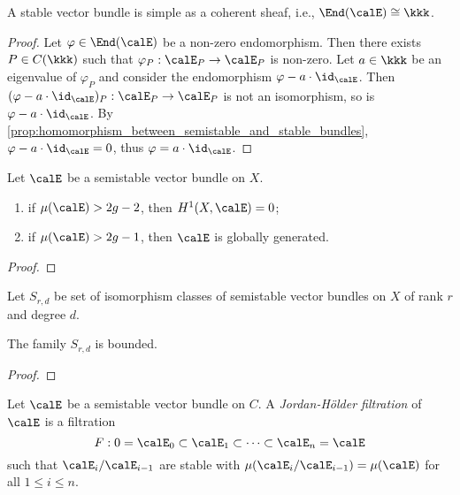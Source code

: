     \begin{corollary}\label{cor:stable_vector_bundles_are_simple}
        A stable vector bundle is simple as a coherent sheaf, i.e., \(\End(\calE) \cong \kkk\).
    \end{corollary}
    \begin{proof}
        Let \(\varphi \in \End(\calE)\) be a non-zero endomorphism.
        Then there exists \(P \in C(\kkk)\) such that \(\varphi_P : \calE_P \to \calE_P\) is non-zero.
        Let \(a \in \kkk\) be an eigenvalue of \(\varphi_P\) and consider the endomorphism \(\varphi - a \cdot \id_\calE\).
        Then \((\varphi - a \cdot \id_\calE)_P : \calE_P \to \calE_P\) is not an isomorphism, so is \(\varphi - a \cdot \id_\calE\).
        By \cref{prop:homomorphism_between_semistable_and_stable_bundles}, \(\varphi - a \cdot \id_\calE = 0\), thus \(\varphi = a \cdot \id_\calE\).
    \end{proof}

    \begin{lemma}\label{lem:vanishing_and_global_generation_of_semistable_vector_bundles}
        Let \(\calE\) be a semistable vector bundle on \(X\).
        \begin{enumerate}
            \item if \(\mu(\calE) > 2g-2\), then \(H^1(X,\calE) = 0\);
            \item if \(\mu(\calE) > 2g-1\), then \(\calE\) is globally generated.
        \end{enumerate}
    \end{lemma}
    \begin{proof}
    \end{proof}

    Let \(S_{r,d}\) be set of isomorphism classes of semistable vector bundles on \(X\) of rank \(r\) and degree \(d\).

    \begin{proposition}\label{prop:semistable_vector_bundles_are_bounded}
        The family \(S_{r,d}\) is bounded.
    \end{proposition}
    \begin{proof}
    \end{proof}


    \begin{definition}\label{def:Jordan-Holder_filtration}
        Let \(\calE\) be a semistable vector bundle on \(C\).
        A \emph{Jordan-H\"older filtration} of \(\calE\) is a filtration 
        \[ F : 0 = \calE_0 \subset \calE_1 \subset \cdots \subset \calE_n = \calE \]
        such that \(\calE_i/\calE_{i-1}\) are stable with \(\mu(\calE_i/\calE_{i-1}) = \mu(\calE)\) for all \(1 \leq i \leq n\).
    \end{definition}


